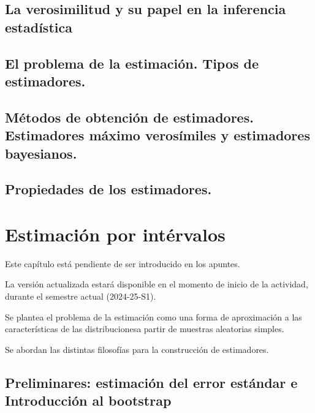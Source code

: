 \documentclass[
]{article}
\begin{document}
\subsection{La verosimilitud y su papel en la inferencia estadística}\label{la-verosimilitud-y-su-papel-en-la-inferencia-estaduxedstica}

\subsection{El problema de la estimación. Tipos de estimadores.}\label{el-problema-de-la-estimaciuxf3n.-tipos-de-estimadores.}

\subsection{Métodos de obtención de estimadores. Estimadores máximo verosímiles y estimadores bayesianos.}\label{muxe9todos-de-obtenciuxf3n-de-estimadores.-estimadores-muxe1ximo-verosuxedmiles-y-estimadores-bayesianos.}

\subsection{Propiedades de los estimadores.}\label{propiedades-de-los-estimadores.}

\section{Estimación por intérvalos}\label{estimaciuxf3n-por-intuxe9rvalos}

Este capítulo está pendiente de ser introducido en los apuntes.

La versión actualizada estará disponible en el momento de inicio de la actividad, durante el semestre actual (2024-25-S1).

Se plantea el problema de la estimación como una forma de aproximación a las características de las distribucionesa partir de muestras aleatorias simples.

Se abordan las distintas filosofías para la construcción de estimadores.

\subsection{Preliminares: estimación del error estándar e Introducción al bootstrap}\label{preliminares-estimaciuxf3n-del-error-estuxe1ndar-e-introducciuxf3n-al-bootstrap}
\end{document}
